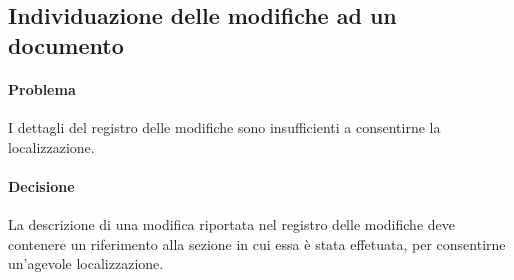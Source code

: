\subsection{Individuazione delle modifiche ad un documento}
\paragraph{Problema} I dettagli del registro delle modifiche sono insufficienti a consentirne la localizzazione.
\paragraph{Decisione} La descrizione di una modifica riportata nel registro delle modifiche deve contenere un riferimento alla sezione in cui essa è stata effetuata, per consentirne un'agevole localizzazione.
